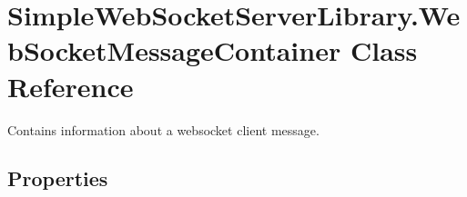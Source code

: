 \hypertarget{class_simple_web_socket_server_library_1_1_web_socket_message_container}{}\section{Simple\+Web\+Socket\+Server\+Library.\+Web\+Socket\+Message\+Container Class Reference}
\label{class_simple_web_socket_server_library_1_1_web_socket_message_container}


Contains information about a websocket client message.  


\subsection*{Properties}

